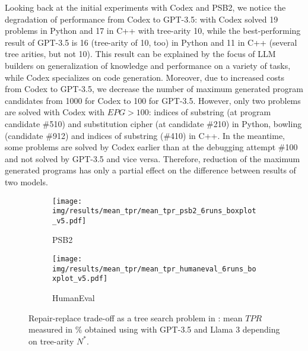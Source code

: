 Looking back at the initial experiments with Codex and PSB2, we notice the degradation of performance from Codex to GPT-3.5: \method{} with Codex solved 19 problems in Python and 17 in C++ with tree-arity 10, while the best-performing result of \method{} GPT-3.5 is 16 (tree-arity of 10, too) in Python and 11 in C++ (several tree arities, but not 10). 
This result can be explained by the focus of LLM builders on generalization of knowledge and performance on a variety of tasks, while Codex specializes on code generation.
Moreover, due to increased costs from Codex to GPT-3.5, we decrease the number of maximum generated program candidates from 1000 for Codex to 100 for GPT-3.5. 
However, only two problems are solved with Codex with $EPG > 100$: indices of substring (at program candidate \#510) and substitution cipher (at candidate \#210) in Python, bowling (candidate \#912) and indices of substring (\#410) in C++. 
In the meantime, some problems are solved by Codex earlier than at the debugging attempt \#100 and not solved by GPT-3.5 and vice versa. 
Therefore, reduction of the maximum generated programs has only a partial effect on the difference between results of two models. 


\begin{figure}[bt]
\begin{subfigure}{\linewidth}
\centering
\texttt{[image: img/results/mean\_tpr/mean\_tpr\_psb2\_6runs\_boxplot\_v5.pdf]}
\vspace{-15pt}
  \caption{PSB2}
  \label{fig:mean-tpr-psb2-gpt3.5}
\end{subfigure}
\begin{subfigure}{\columnwidth}
\centering
\texttt{[image: img/results/mean\_tpr/mean\_tpr\_humaneval\_6runs\_boxplot\_v5.pdf]}
\vspace{-15pt}
  \caption{HumanEval}
  \label{fig:mean-tpr-he-gpt3.5}
\end{subfigure}
\vspace{-16pt}
\caption{Repair-replace trade-off as a tree search problem in \method{}: mean $TPR$ measured in \% obtained using \method{} with GPT-3.5 and Llama 3 depending on tree-arity $N^*$.}
\label{fig:mean-tpr-repair-replace-trade-off-generalizability}
\end{figure}


